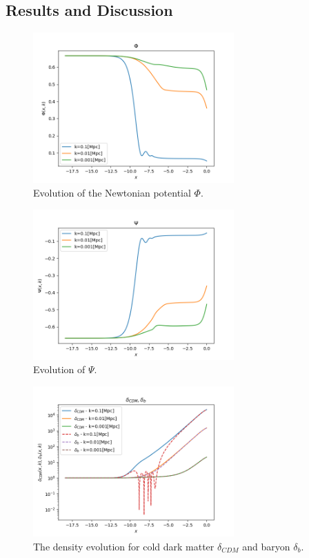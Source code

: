 \documentclass{aa}
\begin{document}
\subsection{Results and Discussion}
\begin{figure}[H]
	\centering
	\includegraphics[width=77mm]{phi.png}
	\caption{Evolution of the Newtonian potential $\Phi$.}
	\label{fig:phi}
\end{figure}
\begin{figure}[H]
	\centering
	\includegraphics[width=77mm]{psi.png}
	\caption{Evolution of $\Psi$.}
	\label{fig:psi}
\end{figure}
\begin{figure}[H]
	\centering
	\includegraphics[width=77mm]{delta_.png}
	\caption{The density evolution for cold dark matter $\delta_{CDM}$ and baryon $\delta_b$.}
	\label{fig:delta_}
\end{figure}
\end{document}
